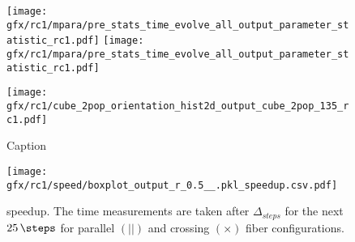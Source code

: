 %
\begin{sidewaysfigure}[!h]
\centering
\texttt{[image: gfx/rc1/mpara/pre\_stats\_time\_evolve\_all\_output\_parameter\_statistic\_rc1.pdf]}
\texttt{[image: gfx/rc1/mpara/pre\_stats\_time\_evolve\_all\_output\_parameter\_statistic\_rc1.pdf]}
\label{app:pste5}
\end{sidewaysfigure}
%
%
% 
%
\begin{figure}[!h]
    \centering
    \texttt{[image: gfx/rc1/cube\_2pop\_orientation\_hist2d\_output\_cube\_2pop\_135\_rc1.pdf]}
    \caption{Caption}
    \label{app:modelHistOrientation}
\end{figure}
%
% 
% 
%
\begin{figure}[!h]
\centering
\texttt{[image: gfx/rc1/speed/boxplot\_output\_r\_0.5\_\_.pkl\_speedup.csv.pdf]}
\caption[ speedup]{ speedup. The time measurements are taken after $\Delta_{\mathit{steps}}$ for the next $\SI{25}{\steps}$ for parallel $(||)$ and crossing $(\times)$ fiber configurations.}
\label{app:solverSpeedupAll}
\end{figure}
%
%
%
